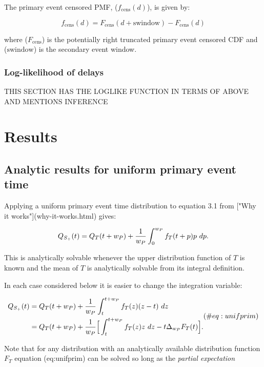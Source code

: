 \documentclass[10pt,letterpaper]{article}
\begin{document}
The primary event censored PMF, ($f_{\text{cens}}(d)$), is given by:

\begin{equation}
f_{\text{cens}}(d) = F_{\text{cens}}(d + \text{swindow}) - F_{\text{cens}}(d)
\end{equation}

where ($F_{\text{cens}}$) is the potentially right truncated primary event censored CDF and ($\text{swindow}$) is the secondary event window.

\subsubsection{Log-likelihood of delays}
THIS SECTION HAS THE LOGLIKE FUNCTION IN TERMS OF ABOVE AND MENTIONS INFERENCE

\section*{Results}

\subsection{Analytic results for uniform primary event time}

Applying a uniform primary event time distribution to equation 3.1 from ["Why it works"](why-it-works.html) gives:

\begin{equation}
Q_{S_+}(t) = Q_T(t + w_P) + { 1 \over w_P} \int_0^{w_P} f_T(t+p) p~ dp.
\end{equation}

This is analytically solvable whenever the upper distribution function of $T$ is known and the mean of $T$ is analytically solvable from its integral definition.

In each case considered below it is easier to change the integration variable:

\begin{equation}
\begin{aligned}
Q_{S_+}(t) &= Q_T(t + w_P) + { 1 \over w_P} \int_t^{t+w_P} f_T(z) (z-t)~ dz \\
&= Q_T(t + w_P) + { 1 \over w_P} \Big[  \int_t^{t+w_P} f_T(z) z~ dz - t \Delta_{w_P}F_T(t) \Big].
\end{aligned} (\#eq:unifprim)
\end{equation}

Note that for any distribution with an analytically available distribution function $F_T$ equation \@ref(eq:unifprim) can be solved so long as the \textit{partial expectation}
\end{document}
